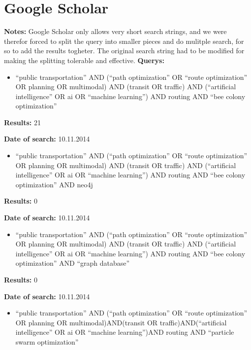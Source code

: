 \section{Google Scholar}
\par \textbf{Notes:} Google Scholar only allows very short search strings, and we were therefor forced to split the query into smaller pieces and do mulitple search, for so to add the results togheter. The original search string had to be modified for making the splitting tolerable and effective. 
\newline
\newline
\textbf{Querys:}
\begin{itemize}
	\item ``public transportation'' AND (``path optimization'' OR ``route optimization'' OR planning OR multimodal) AND (transit OR traffic) AND (``artificial intelligence'' OR ai OR ``machine learning'') AND routing AND ``bee colony optimization''
\end{itemize}
\par \textbf{Results:} 21
\par \textbf{Date of search:} 10.11.2014
\begin{itemize}
	\item ``public transportation'' AND (``path optimization'' OR ``route optimization'' OR planning OR multimodal) AND (transit OR traffic) AND (``artificial intelligence'' OR ai OR ``machine learning'') AND routing AND ``bee colony optimization'' AND neo4j
\end{itemize}
\par \textbf{Results:} 0
\par \textbf{Date of search:} 10.11.2014
\begin{itemize}
	\item ``public transportation'' AND (``path optimization'' OR ``route optimization'' OR planning OR multimodal) AND (transit OR traffic) AND (``artificial intelligence'' OR ai OR ``machine learning'') AND routing AND ``bee colony optimization'' AND ``graph database''
\end{itemize}
\par \textbf{Results:} 0
\par \textbf{Date of search:} 10.11.2014
\begin{itemize}
	\item ``public transportation'' AND (``path optimization'' OR ``route optimization'' OR planning OR multimodal)AND(transit OR traffic)AND(``artificial intelligence'' OR ai OR ``machine learning'')AND routing AND ``particle swarm optimization''
\end{itemize}
